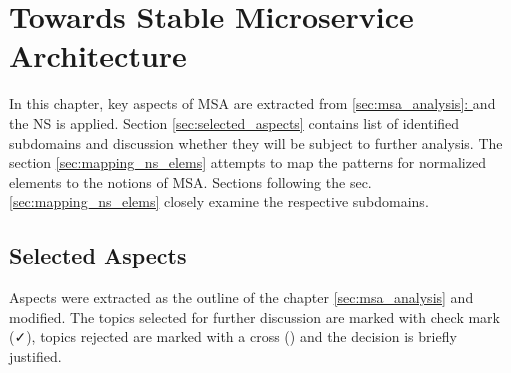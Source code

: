 \documentclass[thesis=M,english,hidelinks]{FITthesis}[2012/10/20]
\newcommand*{\fullref}[1]{\hyperref[{#1}]{\autoref*{#1}: \textit{\nameref*{#1}}}}
\begin{document}
\chapter{Towards Stable Microservice Architecture}
\label{sec:msa_compliance}

In this chapter, key aspects of \acrshort{MSA} are extracted from \fullref{sec:msa_analysis} and the \acrfull{NS} is applied. Section \ref{sec:selected_aspects} contains list of identified subdomains and discussion whether they will be subject to further analysis. The section \ref{sec:mapping_ns_elems} attempts to map the patterns for normalized elements to the notions of \acrshort{MSA}. Sections following the sec. \ref{sec:mapping_ns_elems} closely examine the respective subdomains.

\section{Selected Aspects}

Aspects were extracted as the outline of the chapter \ref{sec:msa_analysis} and modified. The topics selected for further discussion are marked with check mark (\faCheck), topics rejected are marked with a cross (\faRemove) and the decision is briefly justified.
\end{document}
